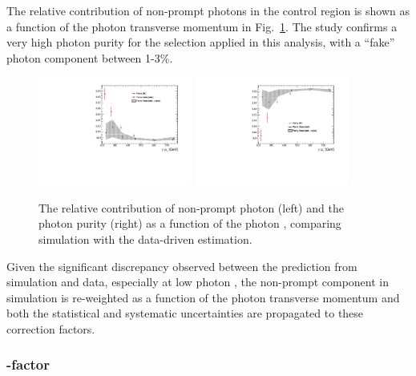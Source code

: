 The relative contribution of non-prompt photons in the \gj control region 
is shown as a function of the photon transverse momentum in Fig.~\ref{fig:photon-purities}.
The study confirms a very high photon purity for the selection applied in this analysis, 
with a ``fake'' photon component between 1-3\%. 

\begin{figure}[h!]
  \centering
  \includegraphics[width=0.45\textwidth]{figures/photonpurity/fakes} 
  \includegraphics[width=0.45\textwidth]{figures/photonpurity/purity} 
  \caption{\label{fig:photon-purities} 
  The relative contribution of non-prompt photon (left) and
  the photon purity (right) as a function of the photon \pt, 
  comparing simulation with the data-driven estimation. }
\end{figure}

Given the significant discrepancy observed between the prediction from simulation and data, 
especially at low photon \pt, 
the non-prompt component in simulation is re-weighted as a function of the photon transverse momentum 
and both the statistical and systematic uncertainties are propagated to these correction factors. 


\subsubsection{\texorpdfstring{\gj} k-factor}
\label{sec:gj-kfactor}

